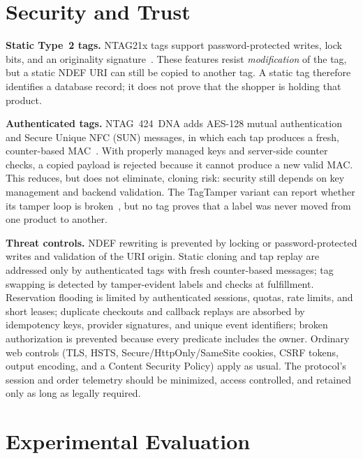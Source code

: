 \documentclass[conference]{IEEEtran}
\begin{document}
\section{Security and Trust}
\label{sec:security}

\textbf{Static Type~2 tags.}
NTAG21x tags support password-protected writes, lock bits, and an
originality signature~\cite{refNTAG21x}. These features resist
\emph{modification} of the tag, but a static NDEF URI can still be
copied to another tag. A static tag therefore identifies a database
record; it does not prove that the shopper is holding that product.

\textbf{Authenticated tags.}
NTAG~424~DNA adds AES-128 mutual authentication and Secure Unique NFC
(SUN) messages, in which each tap produces a fresh, counter-based
MAC~\cite{refNTAG424,refNTAG424App}. With properly managed keys and
server-side counter checks, a copied payload is rejected because it
cannot produce a new valid MAC. This reduces, but does not eliminate,
cloning risk: security still depends on key management and backend
validation. The TagTamper variant can report whether its tamper loop
is broken~\cite{refNTAG424}, but no tag proves that a label was never
moved from one product to another.

\textbf{Threat controls.}
NDEF rewriting is prevented by locking or password-protected writes
and validation of the URI origin. Static cloning and tap replay are
addressed only by authenticated tags with fresh counter-based
messages; tag swapping is detected by tamper-evident labels and checks
at fulfillment. Reservation flooding is limited by authenticated
sessions, quotas, rate limits, and short leases; duplicate checkouts
and callback replays are absorbed by idempotency keys, provider
signatures, and unique event identifiers; broken authorization is
prevented because every predicate includes the owner. Ordinary web
controls (TLS, HSTS, Secure/HttpOnly/SameSite cookies, CSRF tokens,
output encoding, and a Content Security Policy) apply as usual. The
protocol's session and order telemetry should be minimized, access
controlled, and retained only as long as legally required.

\section{Experimental Evaluation}
\label{sec:eval}
\end{document}
